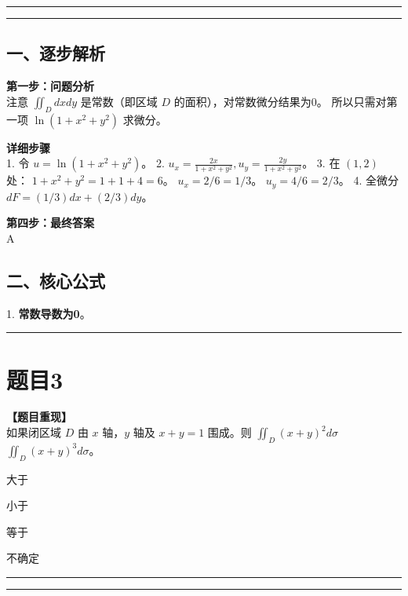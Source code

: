 \documentclass[12pt, a4paper]{ctexart}
\newcommand{\TopSeparator}{
    \par\noindent\rule{\textwidth}{1.5pt}\vspace{0.5em} %
}
\newcommand{\AnalysisSeparator}{
    \par\noindent\rule{\textwidth}{0.5pt}\vspace{0.2em}\hrule\vspace{0.5em} %
}
\newenvironment{RedAnalysis}{
    \par
    \color{red} %
}{
    \par
    \color{black} %
}
\newcommand{\choicesFour}[4]{
    \begin{enumerate}[label=\Alph*., itemsep=0pt, parsep=0pt, topsep=5pt, labelsep=0.5em]
        \begin{minipage}{0.22\linewidth} \item #1 \end{minipage}
        \begin{minipage}{0.22\linewidth} \item #2 \end{minipage}
        \begin{minipage}{0.22\linewidth} \item #3 \end{minipage}
        \begin{minipage}{0.22\linewidth} \item #4 \end{minipage}
    \end{enumerate}
}
\begin{document}
\AnalysisSeparator

\begin{RedAnalysis}

\subsection*{一、逐步解析}

\textbf{第一步：问题分析} \\
注意 $\iint_D dxdy$ 是常数（即区域 $D$ 的面积），对常数微分结果为0。
所以只需对第一项 $\ln(1+x^2+y^2)$ 求微分。

\textbf{详细步骤} \\
1. 令 $u = \ln(1+x^2+y^2)$。
2. $u_x = \frac{2x}{1+x^2+y^2}, u_y = \frac{2y}{1+x^2+y^2}$。
3. 在 $(1,2)$ 处：
   $1+x^2+y^2 = 1+1+4 = 6$。
   $u_x = 2/6 = 1/3$。
   $u_y = 4/6 = 2/3$。
4. 全微分 $dF = (1/3)dx + (2/3)dy$。

\textbf{第四步：最终答案} \\
A

\subsection*{二、核心公式}
1. \textbf{常数导数为0}。

\end{RedAnalysis}

\vspace{2em}

\TopSeparator
\section*{题目3}

\textbf{【题目重现】} \\
如果闭区域 $D$ 由 $x$ 轴，$y$ 轴及 $ x+y=1 $ 围成。则 $ \iint_{D}(x+y)^{2}d\sigma $ \underline{\hspace{1cm}} $ \iint_{D}(x+y)^{3}d\sigma $。
\choicesFour{大于}{小于}{等于}{不确定}

\AnalysisSeparator
\end{document}
